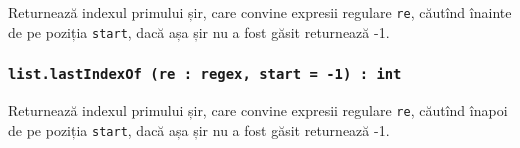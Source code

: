 Returnează indexul primului șir, care convine expresii regulare \texttt{re}, căutînd înainte de pe poziția \texttt{start}, dacă așa șir nu a fost găsit returnează -1.

\subsubsection{\texttt{list.lastIndexOf (re : regex, start = -1) : int}}

Returnează indexul primului șir, care convine expresii regulare \texttt{re}, căutînd înapoi de pe poziția \texttt{start}, dacă așa șir nu a fost găsit returnează -1.


